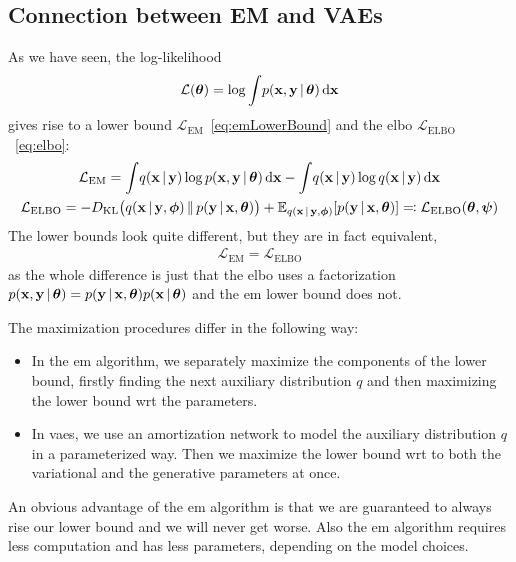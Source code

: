 	\subsection{Connection between EM and VAEs}
		As we have seen, the log-likelihood
		\begin{align*}
			\mathcal{L}(\boldsymbol{\mathrm{\theta}}) = \log \int\! p(\boldsymbol{\mathrm{x}}, \boldsymbol{\mathrm{y}} \,\vert\, \boldsymbol{\mathrm{\theta}}) \dd{\boldsymbol{\mathrm{x}}}
		\end{align*}
		gives rise to a lower bound \( \mathcal{L}_\mathrm{EM} \)~\eqref{eq:emLowerBound} and the \ac{elbo} \( \mathcal{L}_\mathrm{ELBO} \)~\eqref{eq:elbo}:
		\begin{gather*}
			\mathcal{L}_\mathrm{EM} = \int\! q(\boldsymbol{\mathrm{x}} \,\vert\, \boldsymbol{\mathrm{y}}) \log p(\boldsymbol{\mathrm{x}}, \boldsymbol{\mathrm{y}} \,\vert\, \boldsymbol{\mathrm{\theta}}) \dd{\boldsymbol{\mathrm{x}}} - \int\! q(\boldsymbol{\mathrm{x}} \,\vert\, \boldsymbol{\mathrm{y}}) \log q(\boldsymbol{\mathrm{x}} \,\vert\, \boldsymbol{\mathrm{y}}) \dd{\boldsymbol{\mathrm{x}}} \\
			\mathcal{L}_\mathrm{ELBO} = -D_\mathrm{KL}\big( q(\boldsymbol{\mathrm{x}} \,\vert\, \boldsymbol{\mathrm{y}}, \boldsymbol{\mathrm{\phi}}) \,\Vert\, p(\boldsymbol{\mathrm{y}} \,\vert\, \boldsymbol{\mathrm{x}}, \boldsymbol{\mathrm{\theta}}) \big) + \mathbb{E}_{q(\boldsymbol{\mathrm{x}} \,\vert\, \boldsymbol{\mathrm{y}}, \boldsymbol{\mathrm{\phi}})}[p(\boldsymbol{\mathrm{y}} \,\vert\, \boldsymbol{\mathrm{x}}, \boldsymbol{\mathrm{\theta}})] \eqqcolon \mathcal{L}_\mathrm{ELBO}(\boldsymbol{\mathrm{\theta}}, \boldsymbol{\mathrm{\psi}})
		\end{gather*}
		The lower bounds look quite different, but they are in fact equivalent,
		\begin{align*}
			\mathcal{L}_\mathrm{EM} = \mathcal{L}_\mathrm{ELBO}
		\end{align*}
		as the whole difference is just that the \ac{elbo} uses a factorization \( p(\boldsymbol{\mathrm{x}}, \boldsymbol{\mathrm{y}} \,\vert\, \boldsymbol{\mathrm{\theta}}) = p(\boldsymbol{\mathrm{y}} \,\vert\, \boldsymbol{\mathrm{x}}, \boldsymbol{\mathrm{\theta}}) p(\boldsymbol{\mathrm{x}} \,\vert\, \boldsymbol{\mathrm{\theta}}) \) and the \ac{em} lower bound does not.

		The maximization procedures differ in the following way:
		\begin{itemize}
			\item In the \ac{em} algorithm, we separately maximize the components of the lower bound, firstly finding the next auxiliary distribution \(q\) and then maximizing the lower bound \ac{wrt} the parameters.
			\item In \acp{vae}, we use an amortization network to model the auxiliary distribution \(q\) in a parameterized way. Then we maximize the lower bound \ac{wrt} to both the variational and the generative parameters at once.
		\end{itemize}
		An obvious advantage of the \ac{em} algorithm is that we are guaranteed to always rise our lower bound and we will never get worse. Also the \ac{em} algorithm requires less computation and has less parameters, depending on the model choices.
